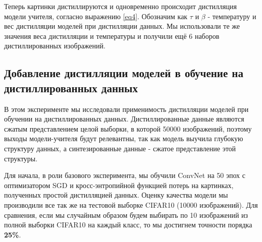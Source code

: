 \documentclass[12pt]{article}
\begin{document}
Теперь картинки дистиллируются и одновременно происходит дистилляция модели учителя, согласно выражению \ref{eq4}. Обозначим как $\tau$ и $\beta$ - температуру и вес дистилляции моделей при дистилляции данных. Мы использовали те же значения веса дистилляции и температуры и получили ещё 6 наборов дистиллированных изображений.




\subsection{Добавление дистилляции моделей в обучение на дистиллированных данных}\label{44}
В этом эксперименте мы исследовали применимость дистилляции моделей при обучении на дистиллированных данных. Дистиллированные данные являются сжатым представлением целой выборки, в которой 50000 изображений, поэтому выходы модели-учителя будут релевантны, так как модель выучила глубокую структуру данных, а синтезированные данные - сжатое представление этой структуры.

Для начала, в роли базового эксперимента, мы обучили ConvNet на 50 эпох с оптимизатором SGD и кросс-энтропийной функцией потерь на картинках, полученных простой дистилляцией данных. Оценку качества модели мы производили все так же на тестовой выборке CIFAR10 (10000 изображений). Для сравнения, если мы случайным образом будем выбирать по 10 изображений из полной выборки CIFAR10 на каждый класс, то мы достигнем точности порядка \textbf{25\%}.
\end{document}
